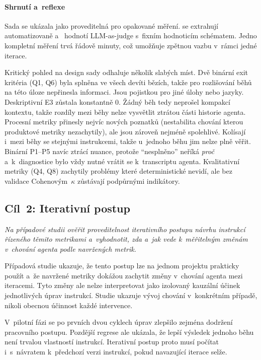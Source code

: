 

\paragraph{Shrnutí a~reflexe}
Sada se ukázala jako proveditelná pro opakované měření. 
se extrahují automatizovaně a~ hodnotí
LLM-as-judge s~fixním hodnoticím schématem. Jedno kompletní měření trvá řádově
minuty, což umožňuje zpětnou vazbu v~rámci jedné iterace.

Kritický pohled na design sady odhaluje několik slabých míst.
Dvě binární exit kritéria (\acs{Q1}, \acs{Q6}) byla splněna ve všech
devíti bězích, takže pro rozlišování běhů na této úloze nepřinesla
informaci. Jsou pojistkou pro jiné úlohy nebo jazyky. Deskriptivní
\acs{E3} zůstala konstantně 0. Žádný běh tedy neprošel kompakcí
kontextu, takže rozdíly mezi běhy nelze vysvětlit ztrátou části
historie agenta. Procesní metriky přinesly nejvíc nových poznatků
(nestabilita chování kterou produktové metriky nezachytily),
ale jsou zároveň nejméně spolehlivé. Kolísají i~mezi běhy se
stejnými instrukcemi, takže u~jednoho běhu jim nelze plně věřit.
Binární \acs{P1}--\acs{P5} navíc ztrácí nuance, protože ``nesplněno''
neříká \textit{proč} a~k~diagnostice bylo vždy nutné vrátit se
k~transcriptu agenta. Kvalitativní metriky (\acs{Q4}, \acs{Q8})
zachytily problémy které deterministické nevidí, ale bez validace
Cohenovým~$\kappa$ zůstávají podpůrnými indikátory.

\subsection{Cíl~2: Iterativní postup}
\label{sec:vyhodnoceni-cil2}

\textit{Na případové studii ověřit proveditelnost iterativního
postupu návrhu instrukcí řízeného těmito metrikami a~vyhodnotit,
zda a~jak vede k~měřitelným změnám v~chování agenta podle
navržených metrik.}

Případová studie ukazuje, že tento postup lze na jednom projektu
prakticky použít a~že navržené metriky dokážou zachytit změny
v~chování agenta mezi iteracemi. Tyto změny ale nelze interpretovat
jako izolovaný kauzální účinek jednotlivých úprav instrukcí. Studie
ukazuje vývoj chování v~konkrétním případě, nikoli obecnou účinnost
každé intervence.

V~pilotní fázi se po prvních dvou cyklech úprav zlepšilo zejména
dodržení pracovního postupu. Pozdější regrese ale ukázala, že lepší
výsledek jednoho běhu není trvalou vlastností instrukcí. Iterativní
postup proto musí počítat i~s~návratem k~předchozí verzi instrukcí,
pokud navazující iterace selže.

